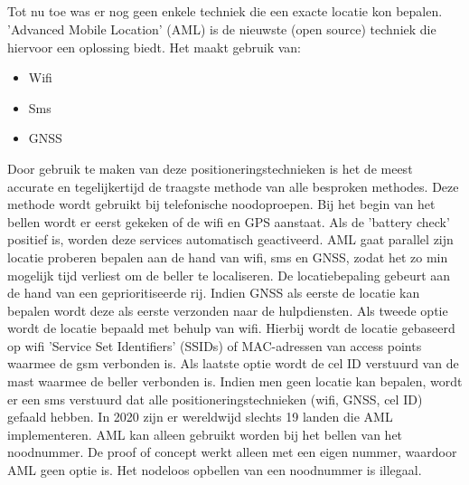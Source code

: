 \subsection{}
Tot nu toe was er nog geen enkele techniek die een exacte locatie kon bepalen. 'Advanced Mobile Location' (AML) is de nieuwste (open source) techniek die hiervoor een oplossing biedt. Het maakt gebruik van:
\begin{itemize}
	\item Wifi
	\item Sms
	\item GNSS
\end{itemize}
Door gebruik te maken van deze positioneringstechnieken is het de meest accurate en tegelijkertijd de traagste methode van alle besproken methodes. 
\newline
Deze methode wordt gebruikt bij telefonische noodoproepen. Bij het begin van het bellen wordt er eerst gekeken of de wifi en GPS aanstaat. Als de 'battery check' positief is, worden deze services automatisch geactiveerd. 
\newline
AML gaat parallel zijn locatie proberen bepalen aan de hand van wifi, sms en GNSS, zodat het zo min mogelijk tijd verliest om de beller te localiseren. De locatiebepaling gebeurt aan de hand van een geprioritiseerde rij. Indien GNSS als eerste de locatie kan bepalen wordt deze als eerste verzonden naar de hulpdiensten. 
Als tweede optie wordt de locatie bepaald met behulp van wifi. Hierbij wordt de locatie gebaseerd op wifi 'Service Set Identifiers' (SSIDs) of MAC-adressen van access points waarmee de gsm verbonden is. Als laatste optie wordt de cel ID verstuurd van de mast waarmee de beller verbonden is. Indien men geen locatie kan bepalen, wordt er een sms verstuurd dat alle positioneringstechnieken (wifi, GNSS, cel ID) gefaald hebben.
\newline
In 2020 zijn er wereldwijd slechts 19 landen die AML implementeren. AML kan alleen gebruikt worden bij het bellen van het noodnummer. De proof of concept werkt alleen met een eigen nummer, waardoor AML geen optie is. \autocite{aml} Het nodeloos opbellen van een noodnummer is illegaal.
